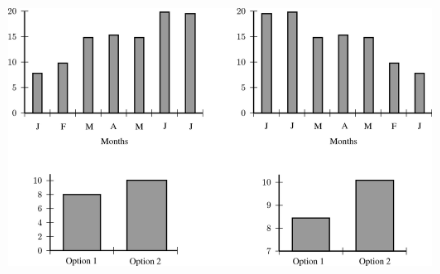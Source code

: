 \begin{description}[noitemsep]
\begin{description}[noitemsep]
\begin{figure}[H]
    \begin{center}
    \label{m39404*id216077!!!underscore!!!media}\label{m39404*id216077!!!underscore!!!printimage}\includegraphics{col11306.imgs/m39404_MG10C16_010.png} %
      \vspace{2pt}
    \vspace{.1in}
    \end{center}
 \end{figure}       
      \par 
      \label{m39404*uid112}

\end{description}
\end{description}

